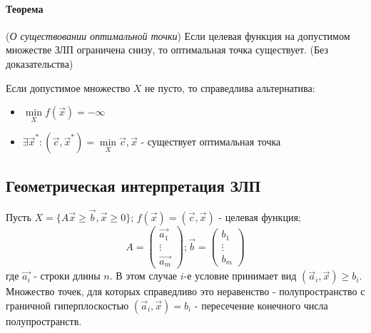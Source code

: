 \documentclass[a4paper, 14pt]{extarticle}
\numberwithin{equation}{section}
\begin{document}
\paragraph{Теорема} (\textit{О существовании оптимальной точки}) Если целевая функция на допустимом множестве ЗЛП ограничена снизу, то оптимальная точка существует. (Без доказательства)

Если допустимое множество $X$ не пусто, то справедлива альтернатива:
\begin{itemize}
	\item $\min\limits_{X} {f(\vec{x})} = -\infty$
	\item $\exists \vec{x}^*: (\vec{c}, \vec{x}^*) = \min\limits_{X} \vec{c}, \vec{x}$ - существует оптимальная точка
\end{itemize}

\subsection{Геометрическая интерпретация ЗЛП}
Пусть $ X = \{A\vec{x} \ge \vec{b}, \vec{x} \ge 0 \}$; $f(\vec{x})=(\vec{c}, \vec{x})$ - целевая функция;
\[
	A = \begin{pmatrix}
		\vec{a_1} \\ \vdots \\ \vec{a_m}
	\end{pmatrix}; \vec{b} = \begin{pmatrix}
		b_1 \\ \vdots \\ b_m
	\end{pmatrix}
\]
где $\vec{a_i}$ - строки длины $n$. В этом случае $i$-е условие принимает вид $(\vec{a}_i, \vec{x}) \ge b_i$. 
Множество точек, для которых справедливо это неравенство - полупространство с граничной гиперплоскостью $(\vec{a}_i, \vec{x}) = b_i$ - пересечение конечного числа полупространств.
\end{document}

